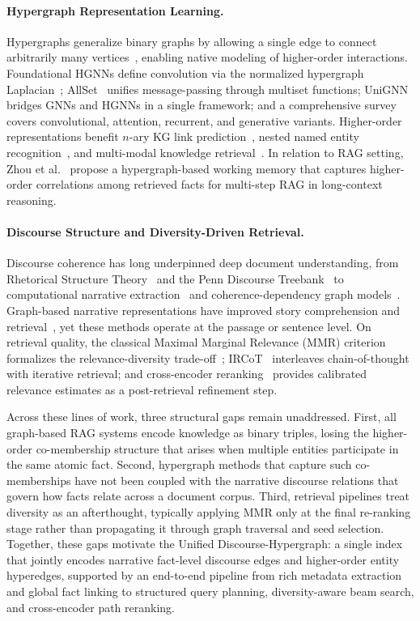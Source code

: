 \documentclass[runningheads]{llncs}
\begin{document}
\paragraph{Hypergraph Representation Learning.}
Hypergraphs generalize binary graphs by allowing a single edge to connect arbitrarily many
vertices~\cite{antelmi2023survey}, enabling native modeling of higher-order
interactions. Foundational HGNNs define convolution via the normalized hypergraph
Laplacian~\cite{feng2019hypergraph}; AllSet~\cite{chien2021you} unifies message-passing through
multiset functions; UniGNN~\cite{huang2021unignn} bridges GNNs and HGNNs in a single
framework; and a comprehensive survey~\cite{kim2024survey} covers convolutional, attention,
recurrent, and generative variants. Higher-order representations benefit $n$-ary KG link
prediction~\cite{wei2025survey}, nested named entity recognition~\cite{yan2023nested}, and
multi-modal knowledge retrieval~\cite{zeng2023multi}. In relation to RAG setting,
Zhou et al.~\cite{zhou2025improving} propose a hypergraph-based working memory that captures higher-order correlations among retrieved facts for multi-step RAG in long-context reasoning.

\paragraph{Discourse Structure and Diversity-Driven Retrieval.}
Discourse coherence has long underpinned deep document understanding, from Rhetorical
Structure Theory~\cite{mann1988rhetorical} and the Penn Discourse Treebank~\cite{prasad2017penn} to
computational narrative extraction~\cite{santana2023survey} and coherence-dependency
graph models~\cite{xu2024graph}. Graph-based narrative representations have improved
story comprehension and retrieval~\cite{dekok:hal-04576222,andrus2022storykg}, yet these
methods operate at the passage or sentence level. On retrieval quality, the classical Maximal Marginal Relevance (MMR)
criterion~\cite{carbonell1998use} formalizes the relevance-diversity
trade-off~\cite{wu2022survey}; IRCoT~\cite{trivedi2023interleaving} interleaves
chain-of-thought with iterative retrieval; and cross-encoder reranking~\cite{nogueira2019passage}
provides calibrated relevance estimates as a post-retrieval refinement step.

Across these lines of work, three structural gaps remain unaddressed. First, all graph-based
RAG systems encode knowledge as binary triples, losing the higher-order co-membership
structure that arises when multiple entities participate in the same atomic fact. Second,
hypergraph methods that capture such co-memberships have not been coupled with the narrative
discourse relations that govern how facts relate across a document corpus. Third, retrieval
pipelines treat diversity as an afterthought, typically applying MMR only at the final
re-ranking stage rather than propagating it through graph traversal and seed selection.
Together, these gaps motivate the Unified Discourse-Hypergraph: a single index that jointly
encodes narrative fact-level discourse edges and higher-order entity hyperedges, supported
by an end-to-end pipeline from rich metadata extraction and global fact linking to
structured query planning, diversity-aware beam search, and cross-encoder path reranking.
\end{document}
